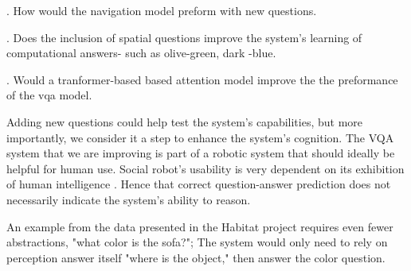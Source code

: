 . How would the navigation model preform with new questions. 


. Does the inclusion of spatial questions improve the system's learning of computational answers- such as olive-green, dark -blue. 

. Would a tranformer-based based attention model improve the the preformance of the vqa model. 

Adding new questions could help test the system's capabilities, but more importantly, we consider it a step to enhance the system's cognition. The VQA system that we are improving is part of a robotic system that should ideally be helpful for human use. Social robot's usability is very dependent on its exhibition of human intelligence \cite{fong2003survey}. Hence that correct question-answer prediction does not necessarily indicate the system's ability to reason. 

An example from the data presented in the Habitat project requires even fewer abstractions, "what color is the sofa?"; The system would only need to rely on perception answer itself "where is the object," then answer the color question.
